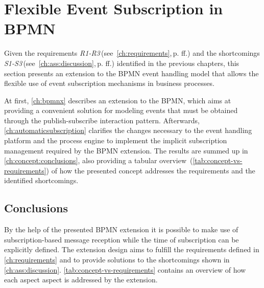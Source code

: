 \chapter{Flexible Event Subscription in BPMN}\label{ch:flexibleeventsubscription}

Given the requirements \textit{R1-R3}\,(see~\autoref{ch:requirements},\,p.\,\pageref{ch:requirements}\,ff.) and the shortcomings \textit{S1-S3}\,(see~\autoref{ch:ass:discussion},\,p.\,\pageref{ch:ass:discussion}\,ff.) identified in the previous chapters, this section presents an extension to the BPMN event handling model that allows the flexible use of event subscription mechanisms in business processes.

At first, \ref{ch:bpmnx} describes an extension to the \acf{BPMN}, which aims at providing a convenient solution for modeling events that must be obtained through the publish-subscribe interaction pattern.
Afterwards, \autoref{ch:automaticsubscription} clarifies the changes necessary to the event handling platform and the process engine to implement the implicit subscription management required by the BPMN extension.
The results are summed up in \autoref{ch:concept:conclusions}, also providing a tabular overview~(\autoref{tab:concept-vs-requirements}) of how the presented concept addresses the requirements and the identified shortcomings.






\section{Conclusions}\label{ch:concept:conclusions}
By the help of the presented BPMN extension it is possible to make use of subscription-based message reception while the time of subscription can be explicitly defined.
The extension design aims to fulfill the requirements defined in \autoref{ch:requirements} and to provide solutions to the shortcomings shown in \autoref{ch:ass:discussion}.
\autoref{tab:concept-vs-requirements} contains an overview of how each aspect aspect is addressed by the extension.

